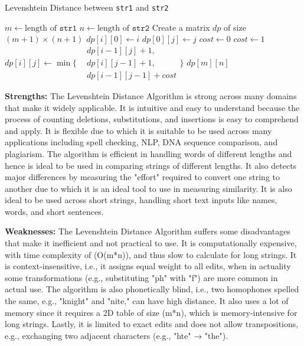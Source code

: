 \documentclass[conference]{IEEEtran}
\begin{document}
\begin{algorithm}
\caption{Levenshtein Distance between \texttt{str1} and \texttt{str2}}
\begin{algorithmic}[1]
\State $m \gets \text{length of } \texttt{str1}$
\State $n \gets \text{length of } \texttt{str2}$
\State Create a matrix $dp$ of size $(m+1) \times (n+1)$
    \State $dp[i][0] \gets i$
\EndFor
{}
    \State $dp[0][j] \gets j$
\EndFor
{}
            \State $cost \gets 0$
        \Else
            \State $cost \gets 1$
        \EndIf
        \State $dp[i][j] \gets \min\Big\{
      \begin{aligned}
      &dp[i{-}1][j] + 1, \\
      &dp[i][j{-}1] + 1, \\
      &dp[i{-}1][j{-}1] + cost
      \end{aligned}
      \Big\}$  
    \EndFor
\EndFor
\State \Return $dp[m][n]$
\end{algorithmic}
\end{algorithm}

\textbf{Strengths:} The Levenshtein Distance Algorithm is strong across many domains that make it widely applicable. It is intuitive and easy to understand because the process of counting deletions, substitutions, and insertions is easy to comprehend and apply. It is flexible due to which it is suitable to be used across many applications including spell checking, NLP, DNA sequence comparison, and plagiarism. The algorithm is efficient in handling words of different lengths and hence is ideal to be used in comparing strings of different lengths. It also detects major differences by measuring the "effort" required to convert one string to another due to which it is an ideal tool to use in measuring similarity. It is also ideal to be used across short strings, handling short text inputs like names, words, and short sentences.

\textbf{Weaknesses:} The Levenshtein Distance Algorithm suffers some disadvantages that make it inefficient and not practical to use. It is computationally expensive, with time complexity of (O(m*n)), and thus slow to calculate for long strings. It is context-insensitive, i.e., it assigns equal weight to all edits, when in actuality some transformations (e.g., substituting "ph" with "f") are more common in actual use. The algorithm is also phonetically blind, i.e., two homophones spelled the same, e.g., "knight" and "nite," can have high distance. It also uses a lot of memory since it requires a 2D table of size (m*n), which is memory-intensive for long strings. Lastly, it is limited to exact edits and does not allow transpositions, e.g., exchanging two adjacent characters (e.g., "hte" → "the").
\end{document}
